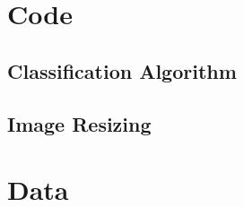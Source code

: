 \documentclass[hidelinks,11pt]{article}
\begin{document}
\pagebreak
\begin{appendices}
  \section{Code}
  \label{sec:app:code}

  \subsection{Classification Algorithm}
  

  \subsection{Image Resizing}
  

  \pagebreak
  \section{Data}
  \label{sec:app:data}


\end{appendices}
\end{document}
